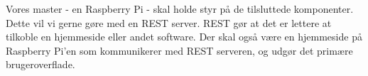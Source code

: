 Vores master - en Raspberry Pi - skal holde styr på de tilsluttede komponenter. Dette vil vi gerne gøre med en REST server. REST gør at det er lettere at tilkoble en hjemmeside eller andet software. Der skal også være en hjemmeside på Raspberry Pi’en som kommunikerer med REST serveren, og udgør det primære brugeroverflade. 